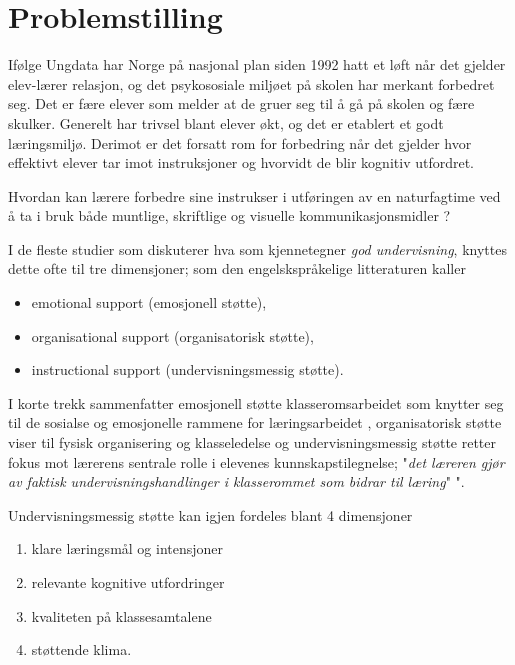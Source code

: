 \documentclass[main.tex]{subfiles}
\begin{document}
\section{Problemstilling}
Ifølge Ungdata har Norge på nasjonal 
plan siden 1992 hatt et løft når det gjelder elev-lærer 
relasjon, og det psykososiale miljøet på skolen har merkant 
forbedret seg. Det er fære elever som melder at de gruer seg til å 
gå på skolen og fære skulker. Generelt har trivsel 
blant elever økt, og det er etablert et godt læringsmiljø. Derimot er det 
forsatt rom for forbedring når det gjelder hvor effektivt elever tar imot 
instruksjoner og hvorvidt de blir kognitiv utfordret. 
\newline

Hvordan kan lærere forbedre sine instrukser i utføringen av en naturfagtime ved å ta i bruk både muntlige,
skriftlige og visuelle kommunikasjonsmidler ?
\newline
    
I de fleste studier som diskuterer hva som kjennetegner \emph{god undervisning}, knyttes 
dette ofte til tre dimensjoner; som den 
engelskspråkelige litteraturen kaller 
\begin{itemize}
\item emotional support (emosjonell støtte),
\item organisational support (organisatorisk støtte),
\item instructional support (undervisningsmessig støtte).
\end{itemize}
I korte trekk sammenfatter emosjonell støtte klasseromsarbeidet som knytter
seg til de sosialse og emosjonelle rammene for læringsarbeidet ,
organisatorisk støtte viser til fysisk organisering og klasseledelse 
og undervisningsmessig støtte retter fokus mot lærerens sentrale rolle i elevenes kunnskapstilegnelse; "\emph{det 
læreren gjør av faktisk undervisningshandlinger i klasserommet som bidrar til læring}" 
".
\newline

Undervisningsmessig støtte kan igjen fordeles blant 4 dimensjoner\cite[side 146]{klette2013}
\begin{enumerate}
\item klare læringsmål og intensjoner
\item relevante kognitive utfordringer
\item kvaliteten på klassesamtalene
\item støttende klima.
\end{enumerate}
\end{document}
